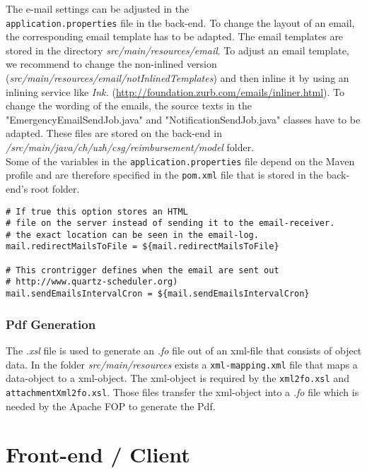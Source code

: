 The e-mail settings can be adjusted in the \\ \texttt{application.properties} file in the back-end. To change the layout of an email, the corresponding email template has to be adapted. The email templates are stored in the directory \textit{src/main/resources/email}. To adjust an email template, we recommend to change the non-inlined version (\textit{src/main/resources/email/notInlinedTemplates}) and then inline it by using an inlining service like \textit{Ink.} (\url{http://foundation.zurb.com/emails/inliner.html}). To change the wording of the emails, the source texts in the "EmergencyEmailSendJob.java" and "NotificationSendJob.java" classes have to be adapted. These files are stored on the back-end in \textit{/src/main/java/ch/uzh/csg/reimbursement/model} folder. \newline \\
Some of the variables in the \texttt{application.properties} file depend on the Maven profile and are therefore specified in the \texttt{pom.xml} file that is stored in the back-end's root folder.

\begin{lstlisting}
# If true this option stores an HTML
# file on the server instead of sending it to the email-receiver.
# the exact location can be seen in the email-log.
mail.redirectMailsToFile = ${mail.redirectMailsToFile}

# This crontrigger defines when the email are sent out
# http://www.quartz-scheduler.org)
mail.sendEmailsIntervalCron = ${mail.sendEmailsIntervalCron}
\end{lstlisting}

\subsubsection{Pdf Generation}
\label{subsubsec:pdf-xml-mappings}

The \textit{.xsl} file is used to generate an \textit{.fo} file out of an xml-file that consists of object data. In the folder \textit{src/main/resources} exists a \texttt{xml-mapping.xml} file that maps a data-object to a xml-object. The xml-object is required by the \texttt{xml2fo.xsl} and \texttt{attachmentXml2fo.xsl}. Those files transfer the xml-object into a \textit{.fo} file which is needed by the Apache FOP to generate the Pdf.



\section{Front-end / Client}

